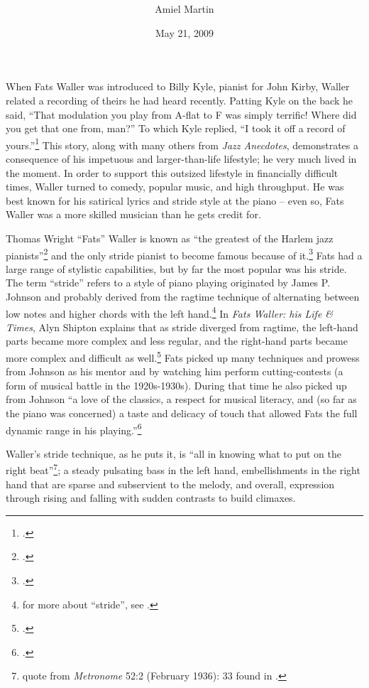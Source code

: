 \documentclass[11pt]{report}
\title{\fattitle \\
		\large \fatslogan}
\author{Amiel Martin}
\date{May 21, 2009}
\begin{document}
	\maketitle

	\label{sec:introduction}
	When Fats Waller was introduced to Billy Kyle, pianist for John Kirby, Waller related a recording of theirs he had heard recently. Patting Kyle on the back he said, ``That modulation you play from A-flat to F was simply terrific! Where did you get that one from, man?'' To which Kyle replied, ``I took it off a record of yours.''\footnote{\cite[231]{anecdotes}.} This story, along with many others from \emph{Jazz Anecdotes}, demonstrates a consequence of his impetuous and larger-than-life lifestyle; he very much lived in the moment. In order to support this outsized lifestyle in financially difficult times, Waller turned to comedy, popular music, and high throughput. He was best known for his satirical lyrics and stride style at the piano -- even so, Fats Waller was a more skilled musician than he gets credit for.

	\label{sec:piano_skills}
	Thomas Wright ``Fats'' Waller is known as ``the greatest of the Harlem jazz pianists''\footnote{\cite[2]{life}.} and the only stride pianist to become famous because of it.\footnote{\cite[146]{visions}.} Fats had a large range of stylistic capabilities, but by far the most popular was his stride. The term ``stride'' refers to a style of piano playing originated by James P. Johnson and probably derived from the ragtime technique of alternating between low notes and higher chords with the left hand.\footnote{for more about ``stride'', see \cite[79]{experience}.} In \emph{Fats Waller: his Life \& Times}, Alyn Shipton explains that as stride diverged from ragtime, the left-hand parts became more complex and less regular, and the right-hand parts became more complex and difficult as well.\footnote{\cite[5]{life}.} Fats picked up many techniques and prowess from Johnson as his mentor and by watching him perform cutting-contests (a form of musical battle in the 1920s-1930s). During that time he also picked up from Johnson ``a love of the classics, a respect for musical literacy, and (so far as the piano was concerned) a taste and delicacy of touch that allowed Fats the full dynamic range in his playing.''\footnote{\cite[8]{life}.}
	
	Waller's stride technique, as he puts it, is ``all in knowing what to put on the right beat''\footnote{quote from \emph{Metronome} 52:2 (February 1936): 33 found in \cite{transcriptions}.}; a steady pulsating bass in the left hand, embellishments in the right hand that are sparse and subservient to the melody, and overall, expression through rising and falling with sudden contrasts to build climaxes.
	
\end{document}
